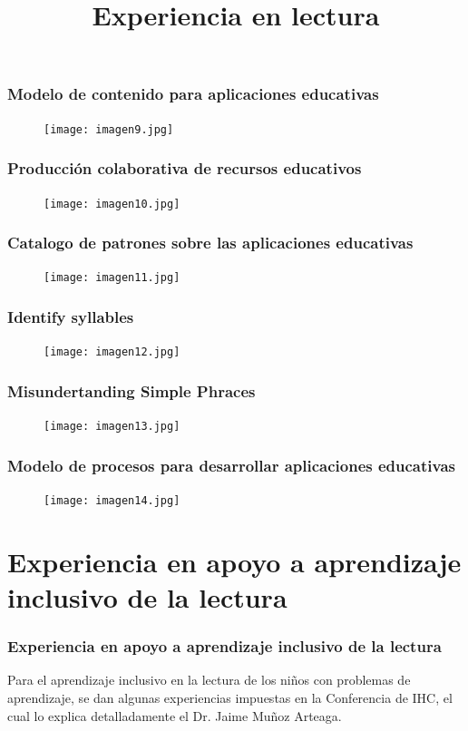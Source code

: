 \documentclass[11pt]{beamer}
\begin{document}
\begin{frame}
\frametitle{Modelo de contenido para aplicaciones educativas}
    \begin{figure}
    \centering
     \texttt{[image: imagen9.jpg]}
    \end{figure}
\end{frame}

\begin{frame}
\frametitle{Producción colaborativa de recursos educativos}
    \begin{figure}
    \centering
     \texttt{[image: imagen10.jpg]}
    \end{figure}
\end{frame}

\begin{frame}
\frametitle{Catalogo de patrones sobre las aplicaciones educativas}
    \begin{figure}
    \centering
     \texttt{[image: imagen11.jpg]}
    \end{figure}
\end{frame}

\begin{frame}
\frametitle{Identify syllables}
    \begin{figure}
    \centering
     \texttt{[image: imagen12.jpg]}
    \end{figure}
\end{frame}

\begin{frame}
\frametitle{Misundertanding Simple Phraces}
    \begin{figure}
    \centering
     \texttt{[image: imagen13.jpg]}
    \end{figure}
\end{frame}

\begin{frame}
\frametitle{Modelo de procesos para desarrollar aplicaciones educativas}
    \begin{figure}
    \centering
     \texttt{[image: imagen14.jpg]}
    \end{figure}
\end{frame}


\section{Experiencia en apoyo a aprendizaje inclusivo de la lectura}
\title{Experiencia en lectura}
\begin{frame}
\frametitle{Experiencia en apoyo a aprendizaje inclusivo de la lectura}
    \justify
    Para el aprendizaje inclusivo en la lectura de los niños con problemas de aprendizaje, se dan algunas experiencias impuestas en la Conferencia de IHC, el cual lo explica detalladamente el Dr. Jaime Muñoz Arteaga.
\end{frame}
\end{document}

